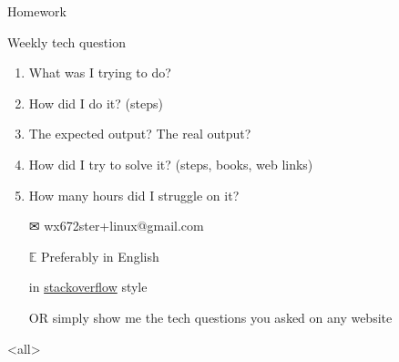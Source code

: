 \begin{frame}{{\hw\enspace}Homework}
  \begin{block}{Weekly tech question}
    \begin{enumerate}
    \item What was I trying to do?
    \item How did I do it? (steps)
    \item The expected output? The real output?
    \item How did I try to solve it? (steps, books, web links)
    \item How many hours did I struggle on it?
    \end{enumerate}
  \end{block}
  \begin{itemize}
  \item[\Large\dejavu ✉] \alert{\ttfamily wx672ster+linux@gmail.com}
  \item[$\mathbb{E}$] Preferably in English
  \item[\stackoverflow] in
    \href{https://stackoverflow.com/questions/39199299/what-is-the-essential-difference-between-compound-command-and-normal-command-inlink}{stackoverflow}
    style
  \item[OR] simply show me the tech questions you asked on any website
  \end{itemize}  
\end{frame}

\begin{frame}
  \begin{center}
  \end{center}
\end{frame}


\mode<all>
